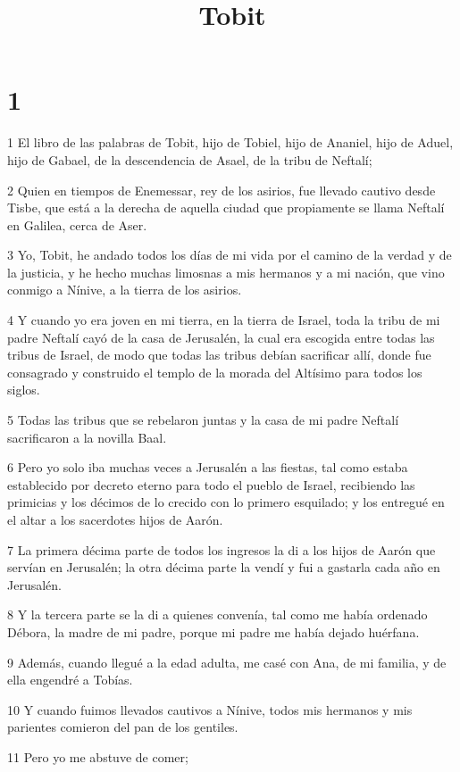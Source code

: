 

\title{Tobit}


\chapter{1}

\par 1 El libro de las palabras de Tobit, hijo de Tobiel, hijo de Ananiel, hijo de Aduel, hijo de Gabael, de la descendencia de Asael, de la tribu de Neftalí;
\par 2 Quien en tiempos de Enemessar, rey de los asirios, fue llevado cautivo desde Tisbe, que está a la derecha de aquella ciudad que propiamente se llama Neftalí en Galilea, cerca de Aser.
\par 3 Yo, Tobit, he andado todos los días de mi vida por el camino de la verdad y de la justicia, y he hecho muchas limosnas a mis hermanos y a mi nación, que vino conmigo a Nínive, a la tierra de los asirios.
\par 4 Y cuando yo era joven en mi tierra, en la tierra de Israel, toda la tribu de mi padre Neftalí cayó de la casa de Jerusalén, la cual era escogida entre todas las tribus de Israel, de modo que todas las tribus debían sacrificar allí, donde fue consagrado y construido el templo de la morada del Altísimo para todos los siglos.
\par 5 Todas las tribus que se rebelaron juntas y la casa de mi padre Neftalí sacrificaron a la novilla Baal.
\par 6 Pero yo solo iba muchas veces a Jerusalén a las fiestas, tal como estaba establecido por decreto eterno para todo el pueblo de Israel, recibiendo las primicias y los décimos de lo crecido con lo primero esquilado; y los entregué en el altar a los sacerdotes hijos de Aarón.
\par 7 La primera décima parte de todos los ingresos la di a los hijos de Aarón que servían en Jerusalén; la otra décima parte la vendí y fui a gastarla cada año en Jerusalén.
\par 8 Y la tercera parte se la di a quienes convenía, tal como me había ordenado Débora, la madre de mi padre, porque mi padre me había dejado huérfana.
\par 9 Además, cuando llegué a la edad adulta, me casé con Ana, de mi familia, y de ella engendré a Tobías.
\par 10 Y cuando fuimos llevados cautivos a Nínive, todos mis hermanos y mis parientes comieron del pan de los gentiles.
\par 11 Pero yo me abstuve de comer;
